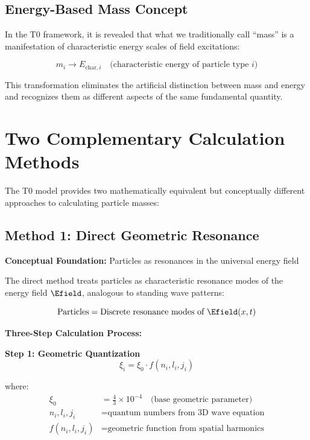 	\subsection{Energy-Based Mass Concept}
	\label{subsec:energy_based_mass}
	
	In the T0 framework, it is revealed that what we traditionally call ``mass'' is a manifestation of characteristic energy scales of field excitations:
	
	\begin{equation}
		\boxed{m_i \rightarrow E_{\text{char},i} \quad \text{(characteristic energy of particle type } i\text{)}}
		\label{eq:mass_to_energy}
	\end{equation}
	
	This transformation eliminates the artificial distinction between mass and energy and recognizes them as different aspects of the same fundamental quantity.
	
	\section{Two Complementary Calculation Methods}
	\label{sec:two_calculation_methods}
	
	The T0 model provides two mathematically equivalent but conceptually different approaches to calculating particle masses:
	
	\subsection{Method 1: Direct Geometric Resonance}
	\label{subsec:direct_geometric_method}
	
	\textbf{Conceptual Foundation:} Particles as resonances in the universal energy field
	
	The direct method treats particles as characteristic resonance modes of the energy field $\Efield$, analogous to standing wave patterns:
	
	\begin{equation}
		\text{Particles} = \text{Discrete resonance modes of } \Efield(x,t)
	\end{equation}
	
	\textbf{Three-Step Calculation Process:}
	
	\textbf{Step 1: Geometric Quantization}
	\begin{equation}
		\xi_i = \xi_0 \cdot f(n_i, l_i, j_i)
		\label{eq:geometric_quantization}
	\end{equation}
	
	where:
	\begin{align}
		\xi_0 &= \frac{4}{3} \times 10^{-4} \quad \text{(base geometric parameter)} \\
		n_i, l_i, j_i &= \text{quantum numbers from 3D wave equation} \\
		f(n_i, l_i, j_i) &= \text{geometric function from spatial harmonics}
	\end{align}
	
